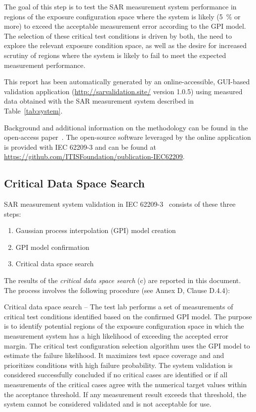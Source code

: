 \documentclass{article}
\begin{document}
The goal of this step is to test the SAR measurement system performance in regions of the exposure configuration space where the system is likely (5~\% or more) to exceed the acceptable measurement error according to the GPI model. The selection of these critical test conditions is driven by both, the need to explore the relevant exposure condition space, as well as the desire for increased scrutiny of regions where the system is likely to fail to meet the expected measurement performance.

This report has been automatically generated by an online-accessible, GUI-based validation application (\url{http://sarvalidation.site/} version 1.0.5) using measured data obtained with the SAR measurement system described in Table~\ref{tab:system}.

Background and additional information on the methodology can be found in the open-access paper~\cite{gpi-paper}. The open-source software leveraged by the online application is provided with IEC 62209-3 and can be found at
\url{https://github.com/ITISFoundation/publication-IEC62209}.

\subsection{Critical Data Space Search}\label{sec:procedure}
SAR measurement system validation in IEC 62209-3~\cite{standard} consists of these three steps:

\begin{enumerate}[label=\alph*)]
\item Gaussian process interpolation (GPI) model creation
\item GPI model confirmation
\item Critical data space search
\end{enumerate}

The results of the \textit{critical data space search} (c) are reported in this document. The process involves the following procedure (see Annex D, Clause D.4.4):

Critical data space search -- The test lab performs a set of measurements of critical test conditions identified based on the confirmed GPI model. The purpose is to identify potential regions of the exposure configuration space in which the measurement system has a high likelihood of exceeding the accepted error margin. The critical test configuration selection algorithm uses the GPI model to estimate the failure likelihood. It  maximizes test space coverage and and prioritizes conditions with high failure probability. The system validation is considered successfully concluded if no critical cases are identified or if all measurements of the critical cases agree with the numerical target values within the acceptance threshold. If any measurement result exceeds that threshold, the system cannot be considered validated and is not acceptable for use.
\end{document}
